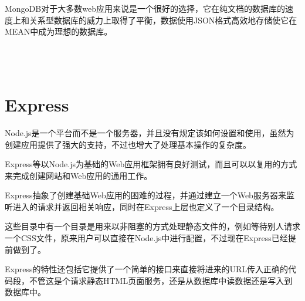 MongoDB对于大多数web应用来说是一个很好的选择，它在纯文档的数据库的速度上和关系型数据库的威力上取得了平衡，数据使用JSON格式高效地存储使它在MEAN中成为理想的数据库。




\begin{lstlisting}[language=JavaScript]

\end{lstlisting}






\begin{lstlisting}[language=JavaScript]

\end{lstlisting}






\begin{lstlisting}[language=JavaScript]

\end{lstlisting}






\begin{lstlisting}[language=JavaScript]

\end{lstlisting}







\section{Express}

Node.js是一个平台而不是一个服务器，并且没有规定该如何设置和使用，虽然为创建应用提供了强大的支持，不过也增大了处理基本操作的复杂度。

Express等以Node.js为基础的Web应用框架拥有良好测试，而且可以以复用的方式来完成创建网站和Web应用的通用工作。

Express抽象了创建基础Web应用的困难的过程，并通过建立一个Web服务器来监听进入的请求并返回相关响应，同时在Express上层也定义了一个目录结构。

这些目录中有一个目录是用来以非阻塞的方式处理静态文件的，例如等待别人请求一个CSS文件，原来用户可以直接在Node.js中进行配置，不过现在Express已经提前做到了。

Express的特性还包括它提供了一个简单的接口来直接将进来的URL传入正确的代码段，不管这是个请求静态HTML页面服务，还是从数据库中读数据还是写入到数据库中。


